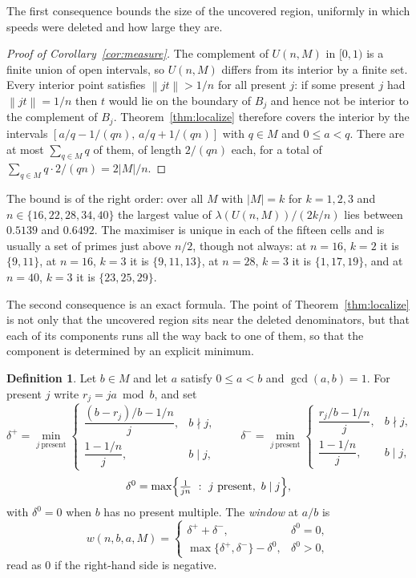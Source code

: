 \documentclass[11pt]{amsart}
\theoremstyle{plain}
\theoremstyle{definition}
\newtheorem{definition}[theorem]{Definition}
\newcommand{\nrm}[1]{\left\lVert #1 \right\rVert}
\begin{document}
The first consequence bounds the size of the uncovered region, uniformly in which speeds were
deleted and how large they are.



\begin{proof}[Proof of Corollary~\ref{cor:measure}]
The complement of $U(n,M)$ in $[0,1)$ is a finite union of open intervals, so $U(n,M)$ differs from
its interior by a finite set. Every interior point satisfies $\nrm{jt}>1/n$ for all present $j$:
if some present $j$ had $\nrm{jt}=1/n$ then $t$ would lie on the boundary of $B_j$ and hence not be
interior to the complement of $B_j$. Theorem~\ref{thm:localize} therefore covers the interior by the
intervals $[a/q-1/(qn),\,a/q+1/(qn)]$ with $q\in M$ and $0\le a<q$. There are at most
$\sum_{q\in M}q$ of them, of length $2/(qn)$ each, for a total of
$\sum_{q\in M}q\cdot 2/(qn)=2|M|/n$.
\end{proof}

The bound is of the right order: over all $M$ with $|M|=k$ for $k=1,2,3$ and
$n\in\{16,22,28,34,40\}$ the largest value of $\lambda(U(n,M))\big/(2k/n)$ lies between $0.5139$ and
$0.6492$. The maximiser is unique in each of the fifteen cells and is usually a set of primes
just above $n/2$, though not always: at $n=16$, $k=2$ it is $\{9,11\}$, at $n=16$, $k=3$ it is
$\{9,11,13\}$, at $n=28$, $k=3$ it is
$\{1,17,19\}$, and at $n=40$, $k=3$ it is $\{23,25,29\}$.

The second consequence is an exact formula. The point of Theorem~\ref{thm:localize} is not only that
the uncovered region sits near the deleted denominators, but that each of its components runs all
the way back to one of them, so that the component is determined by an explicit minimum.

\begin{definition}\label{def:window}
Let $b\in M$ and let $a$ satisfy $0\le a<b$ and $\gcd(a,b)=1$. For present $j$ write
$r_j=ja\bmod b$, and set
\[
  \delta^{+}=\min_{j\ \text{present}}
    \begin{cases}\dfrac{(b-r_j)/b-1/n}{j}, & b\nmid j,\\[2.2ex]
                 \dfrac{1-1/n}{j}, & b\mid j,\end{cases}
  \qquad
  \delta^{-}=\min_{j\ \text{present}}
    \begin{cases}\dfrac{r_j/b-1/n}{j}, & b\nmid j,\\[2.2ex]
                 \dfrac{1-1/n}{j}, & b\mid j,\end{cases}
\]
\[
  \delta^{0}=\max\Bigl\{\tfrac1{jn}\ :\ j\ \text{present},\ b\mid j\Bigr\},
\]
with $\delta^{0}=0$ when $b$ has no present multiple. The \emph{window} at $a/b$ is
\[
  w(n,b,a,M)=\begin{cases}
    \delta^{+}+\delta^{-}, & \delta^{0}=0,\\[0.6ex]
    \max\{\delta^{+},\delta^{-}\}-\delta^{0}, & \delta^{0}>0,
  \end{cases}
\]
read as $0$ if the right-hand side is negative.
\end{definition}
\end{document}
